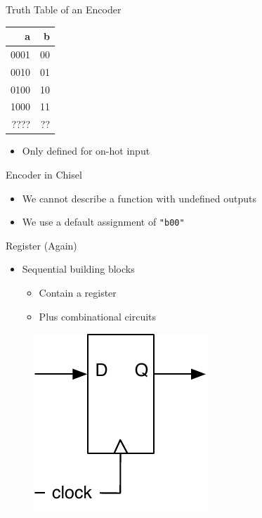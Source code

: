 \documentclass[xcolor=pdflatex,dvipsnames,table]{beamer}
\newcommand{\scale}{0.7}
\newcommand{\code}[1]{{\texttt{#1}}}
\begin{document}
\begin{frame}[fragile]{Truth Table of an Encoder}
\begin{table}
  \begin{tabular}{rr}
    \toprule
    a & b \\
    \midrule
    0001 & 00 \\
    0010 & 01 \\
    0100 & 10 \\
    1000 & 11 \\
    ???? & ?? \\
    \bottomrule 
  \end{tabular} 
\end{table}
\begin{itemize}
\item Only defined for on-hot input
\end{itemize}
\end{frame}

\begin{frame}[fragile]{Encoder in Chisel}
\begin{itemize}
\item We cannot describe a function with undefined outputs
\item We use a default assignment of \code{"b00"}
\end{itemize}

\end{frame}

\begin{frame}[fragile]{Register (Again)}
\begin{itemize}
\item Sequential building blocks
\begin{itemize}
\item Contain a register
\item Plus combinational circuits
\end{itemize}
\end{itemize}
\begin{figure}
  \includegraphics[scale=\scale]{../figures/register}
\end{figure}
\end{frame}
\end{document}
